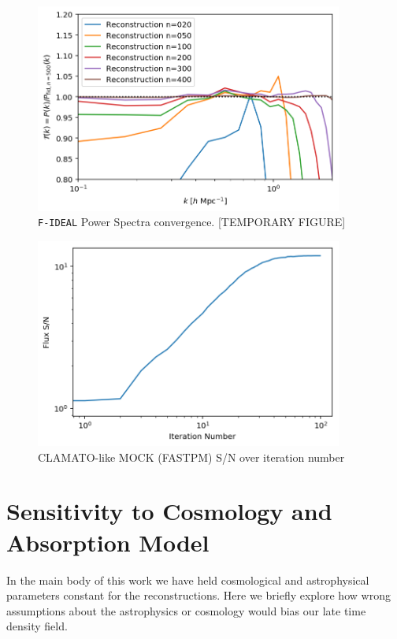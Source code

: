 \documentclass[usenatbib,onecolumn]{mnras}
\begin{document}
\begin{figure}
  \centering  \includegraphics[trim=0cm 0cm 0cm 0cm,width=0.90\textwidth]{./appendix_figures/transfer_iterations.png}
    \caption{\texttt{F-IDEAL} Power Spectra convergence. [TEMPORARY FIGURE]} 
    \label{fig_sims2x2}
\end{figure}


\begin{figure}
  \centering  \includegraphics[trim=0cm 0cm 0cm 0cm,width=0.90\textwidth]{./figs_fastpm/flux_sn.png}
    \caption{CLAMATO-like MOCK (FASTPM) S/N over iteration number} 
    \label{fig_sims2x2}
\end{figure}




\section{Sensitivity to Cosmology and Absorption Model}
\label{app:sens}

In the main body of this work we have held cosmological and astrophysical parameters constant for the reconstructions. Here we briefly explore how wrong assumptions about the astrophysics or cosmology would bias our late time density field. 
\end{document}
